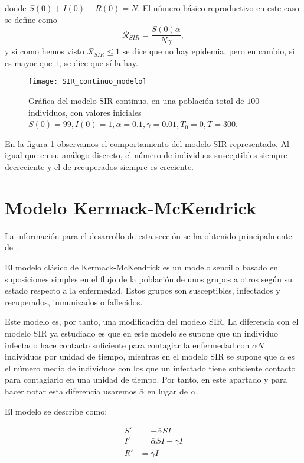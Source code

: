 donde $S(0)+I(0)+R(0)=N$. El número básico reproductivo en este caso se define como
$$\mathcal{R}_{SIR}=\frac{S(0)\alpha }{N\gamma },$$
y si como hemos visto $\mathcal{R}_{SIR}\leq 1$  se dice que no hay epidemia, pero en cambio, si es mayor que $1$, se dice que sí la hay.

\begin{figure}
\begin{center}
\caption{Gráfica del modelo SIR continuo, en una población total de $100$ individuos, con valores iniciales $S(0)=99, I(0) = 1, \alpha = 0.1, \gamma = 0.01, T_0 = 0, T = 300$.}
\label{fig: SIR_continuo}
\texttt{[image: SIR\_continuo\_modelo]}
\end{center}
\end{figure}

En la figura \ref{fig: SIR_continuo} observamos el comportamiento del modelo SIR representado. Al igual que en su análogo discreto, el número de individuos susceptibles siempre decreciente y el de recuperados siempre es creciente.

\section{Modelo Kermack-McKendrick}

La información para el desarrollo de esta sección se ha obtenido principalmente de \cite{brauerMathematicalModelsPopulation2012}.

El modelo clásico de Kermack-McKendrick es un modelo sencillo basado en suposiciones simples en el flujo de la población de unos grupos a otros según su estado respecto a la enfermedad. Estos grupos son susceptibles, infectados y recuperados, inmunizados o fallecidos.

Este modelo es, por tanto, una modificación del modelo SIR. La diferencia con el modelo SIR ya estudiado es que en este modelo se supone que un individuo infectado hace contacto suficiente para contagiar la enfermedad con $\alpha N$ individuos por unidad de tiempo, mientras en el modelo SIR se supone que $\alpha$ es el número medio de individuos con los que un infectado tiene suficiente contacto para contagiarlo en una unidad de tiempo. Por tanto, en este apartado y para hacer notar esta diferencia usaremos $\bar{\alpha}$ en lugar de $\alpha$.

El modelo se describe como:

\begin{equation}
\label{eqn: KMK}
\begin{aligned}
S' & = -\bar{\alpha} SI \\
I' & = \bar{\alpha} SI - \gamma I \\
R' & = \gamma I
\end{aligned}
\end{equation}

